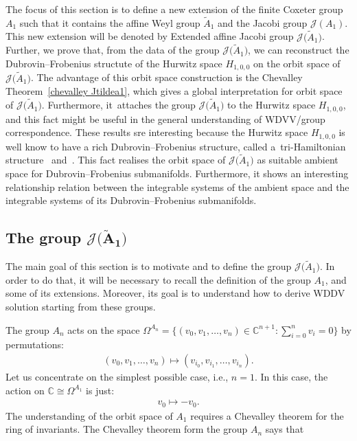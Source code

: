 \documentclass[10pt,a4paper]{amsart}
\numberwithin{equation}{section}
\newcommand{\Ja}{\mathcal{J}}
\begin{document}
 The focus of this section is to define a new extension of the finite Coxeter group $A_1$ such that it contains the affine Weyl group $\tilde A_1$ and the Jacobi group $\Ja(A_1)$. This new extension will be denoted by Extended affine Jacobi group $\Ja\big(\tilde A_1\big)$. Further, we prove that, from the data of the group $\Ja\big(\tilde A_1\big)$, we can reconstruct the Dubrovin--Frobenius structute of the Hurwitz space $H_{1,0,0}$ on the orbit space of $\Ja\big(\tilde A_1\big)$. The advantage of this orbit space construction is the Chevalley Theorem~\ref{chevalley Jtildea1}, which gives a global interpretation for orbit space of $\Ja\big(\tilde A_1\big)$. Furthermore, it~attaches the group $\Ja\big(\tilde A_1\big)$ to the Hurwitz space $H_{1,0,0}$, and this fact might be useful in the general understanding of WDVV/group correspondence. These results sre interesting because the Hurwitz space $H_{1,0,0}$ is well know to have a rich Dubrovin--Frobenius structure, called a~tri-Hamiltonian structure~\cite{Romano1} and~\cite{Pavlov2}. This fact realises the orbit space of $\Ja\big(\tilde A_1\big)$ as suitable ambient space for Dubrovin--Frobenius submanifolds. Furthermore, it shows an interesting relationship relation between the integrable systems of the ambient space and the integrable systems of its Dubrovin--Frobenius submanifolds.

\subsection[The group J(A1)]
{The group $\boldsymbol{\Ja\big(\tilde A_1\big)}$}\label{group def}

The main goal of this section is to motivate and to define the group $\Ja\big(\tilde A_1\big)$. In order to do that, it will be necessary to recall the definition of the group $A_1$, and some of its extensions. Moreover, its goal is to understand how to derive WDDV solution starting from these groups.

The group $A_n$ acts on the space $\Omega^{A_n}=\big\{(v_0,v_1,\dots,v_n)\in \mathbb{C}^{n+1}\colon\sum _{i=0}^nv_i=0 \big\}$ by permutations:
\begin{gather}\label{An action permutation}
(v_0,v_1,\dots,v_n)\mapsto(v_{i_0},v_{i_1},\dots,v_{i_n}).
\end{gather}
Let us concentrate on the simplest possible case, i.e., $n=1$. In this case, the action on $\mathbb{C}\cong\Omega^{A_1}$ is just:
\begin{gather*}
v_0\mapsto -v_0.
\end{gather*}
The understanding of the orbit space of $A_1$ requires a Chevalley theorem for the ring of invariants. The Chevalley theorem form the group $A_n$ says that
\end{document}
